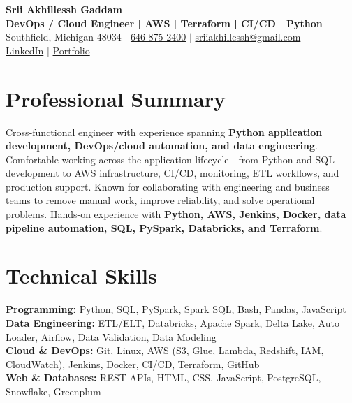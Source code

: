 \documentclass[letterpaper,10pt]{article}
\begin{document}
\fontsize{9.35pt}{10.45pt}\selectfont

\begin{center}
    {\LARGE \textbf{Srii Akhillessh Gaddam}} \\[-1pt]
    \textbf{DevOps / Cloud Engineer | AWS | Terraform | CI/CD | Python} \\[2pt]
    Southfield, Michigan 48034 $|$
    \href{tel:6468752400}{646-875-2400} $|$
    \href{mailto:sriiakhillessh@gmail.com}{sriiakhillessh@gmail.com} \\[1pt]
    \href{https://www.linkedin.com/in/srii-akhiilessh-gaddam-b48668191/}{LinkedIn} $|$
    \href{https://sriiakhillesshg.github.io/portfolio/}{Portfolio}
\end{center}
\vspace{-8pt}

\section{Professional Summary}
\small{Cross-functional engineer with experience spanning \textbf{Python application development, DevOps/cloud automation, and data engineering}. Comfortable working across the application lifecycle - from Python and SQL development to AWS infrastructure, CI/CD, monitoring, ETL workflows, and production support. Known for collaborating with engineering and business teams to remove manual work, improve reliability, and solve operational problems. Hands-on experience with \textbf{Python, AWS, Jenkins, Docker, data pipeline automation, SQL, PySpark, Databricks, and Terraform}.}

\section{Technical Skills}
\small{
\textbf{Programming:} Python, SQL, PySpark, Spark SQL, Bash, Pandas, JavaScript \\
\textbf{Data Engineering:} ETL/ELT, Databricks, Apache Spark, Delta Lake, Auto Loader, Airflow, Data Validation, Data Modeling \\
\textbf{Cloud \& DevOps:} Git, Linux, AWS (S3, Glue, Lambda, Redshift, IAM, CloudWatch), Jenkins, Docker, CI/CD, Terraform, GitHub \\
\textbf{Web \& Databases:} REST APIs, HTML, CSS, JavaScript, PostgreSQL, Snowflake, Greenplum
}
\end{document}
